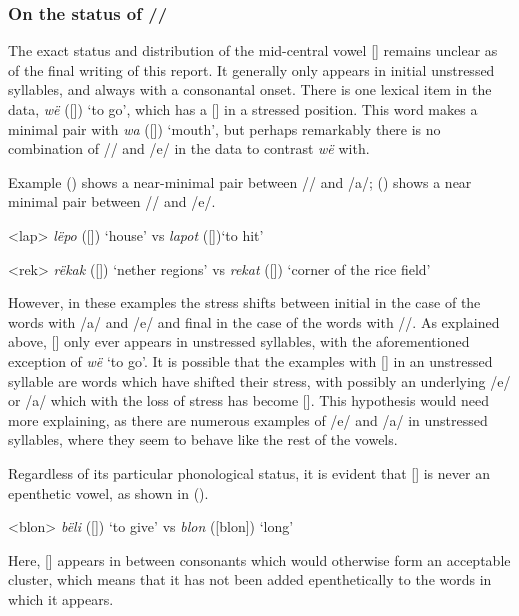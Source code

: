 \documentclass[../hewa_main-subfiles.tex]{subfiles}
\begin{document}
\subsubsection{On the status of /\textschwa/}

The exact status and distribution of the mid-central vowel [\textschwa] remains unclear as of the final writing of this report. It generally only appears in initial unstressed syllables, and always with a consonantal onset. There is one lexical item in the data, \textit{wë} ([]) `to go', which has a [\textschwa] in a stressed position. This word makes a minimal pair with  \textit{wa} ([]) `mouth', but perhaps remarkably there is no combination of /\textbeta / and /e/ in the data to contrast \textit{wë} with.

Example () shows a near-minimal pair between /\textschwa / and /a/; () shows a near minimal pair between /\textschwa / and /e/.

\ex<lap> \textit{lëpo} ([]) `house' vs \textit{lapot}  ([])`to hit'
\xe

\ex<rek> \textit{rëkak} ([]) `nether regions' vs \textit{rekat} ([]) `corner of the rice field'
\xe

However, in these examples the stress shifts between initial in the case of the words with /a/ and /e/ and final in the case of the words with /\textschwa /. As explained above, [\textschwa] only ever appears in unstressed syllables, with the aforementioned exception of \textit{wë} `to go'. It is possible that the examples with [\textschwa] in an unstressed syllable are words which have shifted	 their stress, with possibly an underlying /e/ or /a/ which with the loss of stress has become [\textschwa]. This hypothesis would need more explaining, as there are numerous examples of /e/ and /a/ in unstressed syllables, where they seem to behave like the rest of the vowels.

Regardless of its particular phonological status, it is evident that [\textschwa] is never an epenthetic vowel, as shown in ().

\ex<blon> \textit{bëli} ([]) `to give' vs \textit{blon} ([blon]) `long'
\xe

Here, [\textschwa] appears in between consonants which would otherwise form an acceptable cluster, which means that it has not been added epenthetically to the words in which it appears.
\end{document}
